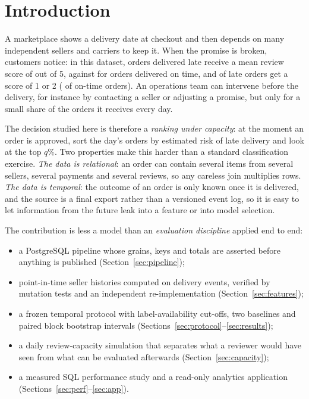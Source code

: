 \documentclass[10pt,twocolumn]{article}
\begin{document}
\section{Introduction}

A marketplace shows a delivery date at checkout and then depends on many independent sellers and
carriers to keep it. When the promise is broken, customers notice: in this dataset, orders delivered
late receive a mean review score of \ReviewLate{} out of 5, against \ReviewOnTime{} for orders delivered
on time, and \LowLate{} of late orders get a score of 1 or 2 (\LowOnTime{} of on-time orders). An
operations team can intervene before the delivery, for instance by contacting a seller or adjusting a
promise, but only for a small share of the orders it receives every day.

The decision studied here is therefore a \emph{ranking under capacity}: at the moment an order is
approved, sort the day's orders by estimated risk of late delivery and look at the top $q\%$.
Two properties make this harder than a standard classification exercise.
\emph{The data is relational}: an order can contain several items from several sellers, several
payments and several reviews, so any careless join multiplies rows. \emph{The data is temporal}: the
outcome of an order is only known once it is delivered, and the source is a final export rather than a
versioned event log, so it is easy to let information from the future leak into a feature or into
model selection.

The contribution is less a model than an \emph{evaluation discipline} applied end to end:
\begin{itemize}
\item a PostgreSQL pipeline whose grains, keys and totals are asserted before anything is published
      (Section~\ref{sec:pipeline});
\item point-in-time seller histories computed on delivery events, verified by mutation tests and an
      independent re-implementation (Section~\ref{sec:features});
\item a frozen temporal protocol with label-availability cut-offs, two baselines and paired block
      bootstrap intervals (Sections~\ref{sec:protocol}--\ref{sec:results});
\item a daily review-capacity simulation that separates what a reviewer would have seen from what
      can be evaluated afterwards (Section~\ref{sec:capacity});
\item a measured SQL performance study and a read-only analytics application
      (Sections~\ref{sec:perf}--\ref{sec:app}).
\end{itemize}
\end{document}
